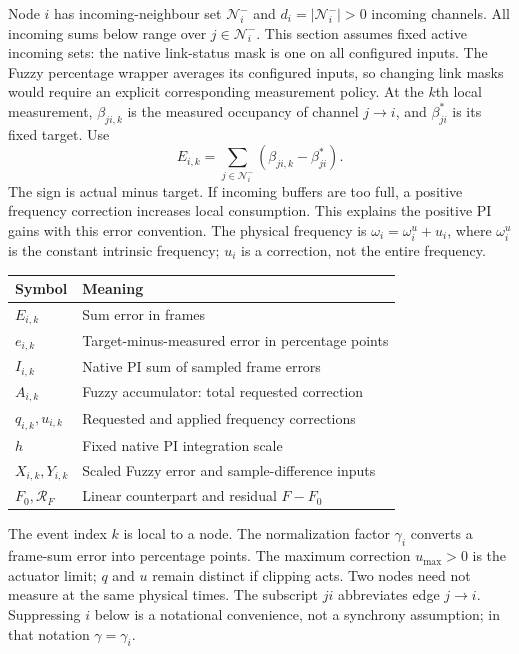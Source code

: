 Node $i$ has incoming-neighbour set $\mathcal N_i^-$ and $d_i=|\mathcal N_i^-|>0$ incoming channels. All incoming sums below range over $j\in\mathcal N_i^-$. This section assumes fixed active
incoming sets: the native link-status mask is one on all configured inputs.
The Fuzzy percentage wrapper averages its configured inputs, so changing
link masks would require an explicit corresponding measurement policy.
At the $k$th local measurement,
$\beta_{ji,k}$ is the measured occupancy of channel $j\to i$, and
$\beta^*_{ji}$ is its fixed target. Use
\begin{equation}
 E_{i,k}=\sum_{j\in\mathcal N_i^-}(\beta_{ji,k}-\beta^*_{ji}).
 \label{eq:fpi_error}
\end{equation}
The sign is actual minus target. If incoming buffers are too full, a
positive frequency correction increases local consumption. This explains
the positive PI gains with this error convention. The physical frequency is $\omega_i=\omega_i^u+u_i$, where $\omega_i^u$ is the constant intrinsic frequency; $u_i$ is a correction, not the entire frequency.

\begin{center}
\begin{tabular}{@{}ll@{}}
\toprule
Symbol & Meaning \\
\midrule
$E_{i,k}$ & Sum error in frames \\
$e_{i,k}$ & Target-minus-measured error in percentage points \\
$I_{i,k}$ & Native PI sum of sampled frame errors \\
$A_{i,k}$ & Fuzzy accumulator: total requested correction \\
$q_{i,k},u_{i,k}$ & Requested and applied frequency corrections \\
$h$ & Fixed native PI integration scale \\
$X_{i,k},Y_{i,k}$ & Scaled Fuzzy error and sample-difference inputs \\
$F_0,\mathcal R_F$ & Linear counterpart and residual $F-F_0$ \\
\bottomrule
\end{tabular}
\end{center}

The event index $k$ is local to a node. The normalization factor $\gamma_i$ converts a frame-sum error into percentage points. The maximum correction $u_{\max}>0$ is the actuator limit; $q$ and $u$ remain distinct if clipping acts. Two nodes need not measure at the
same physical times. The subscript $ji$ abbreviates edge $j\to i$.
Suppressing $i$ below is a notational convenience, not a synchrony
assumption; in that notation $\gamma=\gamma_i$.

